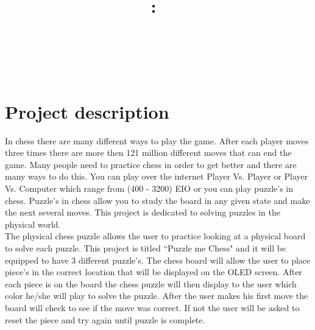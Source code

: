 \documentclass[11pt]{article}
\title{\vspace{2in}\textmd{\textbf{\hmwkClass:\ \hmwkTitle}}\\\normalsize\vspace{0.1in}\small{\hmwkDueDate}\\\vspace{0.1in}\large{\textit{\hmwkClassInstructor\ }}\vspace{3in}}
\date{}
\author{\textbf{\hmwkAuthorName}}
\begin{document}
\maketitle %
\newpage

\tableofcontents %
\newpage
\listoffigures
\listoftables
\lstlistoflistings




\clearpage 
\section{Project description}



In chess there are many different ways to play the game. After each player moves three times there are more then 121 million different moves that can end the game. Many people need to practice chess in order to get better and there are many ways to do this. You can play over the internet Player Vs. Player or Player Vs. Computer which range from (400 - 3200) EIO or you can play puzzle's in chess. Puzzle's in chess allow you to study the board in any given state and make the next several moves. This project is dedicated to solving puzzles in the physical world. 
\\

\noindent The physical chess puzzle allows the user to practice looking at a physical board to solve each puzzle. This project is titled ``Puzzle me Chess" and it will be equipped to have 3 different puzzle's. The chess board will allow the user to place piece's in the correct location that will be displayed on the OLED screen. After each piece is on the board the chess puzzle will then display to the user which color he/she will play to solve the puzzle. After the user makes his first move the board will check to see if the move was correct. If not the user will be asked to reset the piece and try again until puzzle is complete. 
\end{document}
